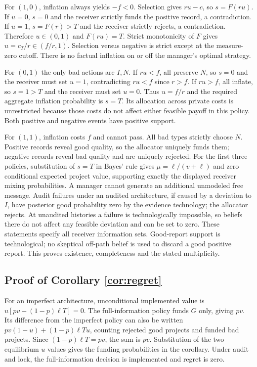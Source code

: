 \documentclass[11pt]{article}
\begin{document}
For $(1,0)$, inflation always yields $-f<0$. Selection gives $ru-c$, so $s=F(ru)$. If $u=0$, $s=0$ and the receiver strictly funds the positive record, a contradiction. If $u=1$, $s=F(r)>T$ and the receiver strictly rejects, a contradiction. Therefore $u\in(0,1)$ and $F(ru)=T$. Strict monotonicity of $F$ gives $u=c_T/r\in(f/r,1)$. Selection versus negative is strict except at the measure-zero cutoff. There is no factual inflation on or off the manager's optimal strategy.

For $(0,1)$ the only bad actions are $I,N$. If $ru<f$, all preserve $N$, so $s=0$ and the receiver must set $u=1$, contradicting $ru<f$ since $r>f$. If $ru>f$, all inflate, so $s=1>T$ and the receiver must set $u=0$. Thus $u=f/r$ and the required aggregate inflation probability is $s=T$. Its allocation across private costs is unrestricted because those costs do not affect either feasible payoff in this policy. Both positive and negative events have positive support.

For $(1,1)$, inflation costs $f$ and cannot pass. All bad types strictly choose $N$. Positive records reveal good quality, so the allocator uniquely funds them; negative records reveal bad quality and are uniquely rejected. For the first three policies, substitution of $s=T$ in Bayes' rule gives $\mu=\ell/(v+\ell)$ and zero conditional expected project value, supporting exactly the displayed receiver mixing probabilities. A manager cannot generate an additional unmodeled free message. Audit failures under an audited architecture, if caused by a deviation to $I$, have posterior good probability zero by the evidence technology; the allocator rejects. At unaudited histories a failure is technologically impossible, so beliefs there do not affect any feasible deviation and can be set to zero. These statements specify all receiver information sets. Good-report support is technological; no skeptical off-path belief is used to discard a good positive report. This proves existence, completeness and the stated multiplicity.
\subsection{Proof of Corollary \ref{cor:regret}}
For an imperfect architecture, unconditional implemented value is $u[pv-(1-p)\ell T]=0$. The full-information policy funds $G$ only, giving $pv$. Its difference from the imperfect policy can also be written $pv(1-u)+(1-p)\ell Tu$, counting rejected good projects and funded bad projects. Since $(1-p)\ell T=pv$, the sum is $pv$. Substitution of the two equilibrium $u$ values gives the funding probabilities in the corollary. Under audit and lock, the full-information decision is implemented and regret is zero.
\end{document}
